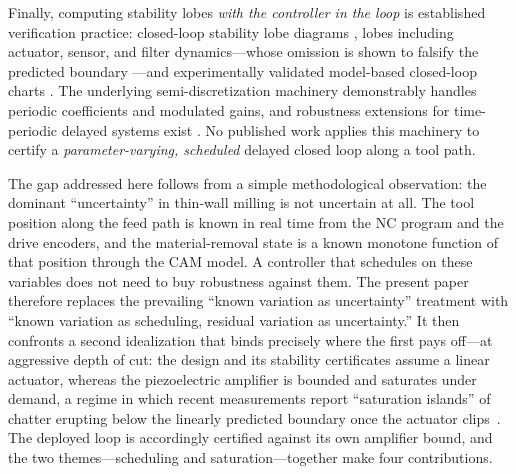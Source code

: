 \documentclass[preprint,12pt]{elsarticle}
\begin{document}
Finally, computing stability lobes \emph{with the controller in the
loop} is established verification practice: closed-loop stability lobe
diagrams \cite{zhang2019discrete}, lobes including actuator, sensor, and
filter dynamics---whose omission is shown to falsify the predicted
boundary \cite{lehotzky2021milling}---and experimentally validated
model-based closed-loop charts
\cite{monnin2014modeling,monnin2014experimental}. The underlying
semi-discretization machinery
\cite{insperger2002semi,insperger2004updated,insperger2011semi}
demonstrably handles periodic coefficients and modulated gains, and
robustness extensions for time-periodic delayed systems exist
\cite{borgioli2020pseudospectral}. No published work applies this
machinery to certify a \emph{parameter-varying, scheduled} delayed
closed loop along a tool path.

The gap addressed here follows from a simple methodological observation:
the dominant ``uncertainty'' in thin-wall milling is not uncertain at
all. The tool position along the feed path is known in real time from
the NC program and the drive encoders, and the material-removal state is
a known monotone function of that position through the CAM model. A
controller that schedules on these variables does not need to buy
robustness against them. The present paper therefore replaces the
prevailing ``known variation as uncertainty'' treatment with ``known
variation as scheduling, residual variation as uncertainty.'' It then
confronts a second idealization that binds precisely where the first
pays off---at aggressive depth of cut: the design and its stability
certificates assume a linear actuator, whereas the piezoelectric
amplifier is bounded and saturates under demand, a regime in which
recent measurements report ``saturation islands'' of chatter erupting
below the linearly predicted boundary once the actuator
clips~\cite{ozsoy2025mssp}. The deployed loop is accordingly certified
against its own amplifier bound, and the two themes---scheduling and
saturation---together make four contributions.
\end{document}
